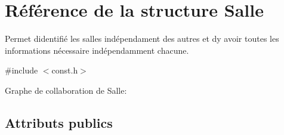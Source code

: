 \hypertarget{structSalle}{}\section{Référence de la structure Salle}
\label{structSalle}


Permet d\textquotesingle{}identifié les salles indépendament des autres et d\textquotesingle{}y avoir toutes les informations nécessaire indépendamment chacune.  




{\ttfamily \#include $<$const.\+h$>$}



Graphe de collaboration de Salle\+:
\subsection*{Attributs publics}
